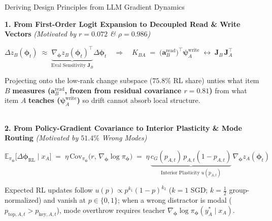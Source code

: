 \documentclass[aspectratio=169, 10pt]{beamer}
\begin{document}
\begin{frame}{Deriving Design Principles from LLM Gradient Dynamics}
  \footnotesize
  \vspace{-1.5mm}

  \noindent\textbf{\color{NavyHeader}1. From First-Order Logit Expansion to Decoupled Read \& Write Vectors} \hfill {\scriptsize\color{MutedGray}\emph{(Motivated by $r=0.072$ \& $\rho=0.986$)}}\\[0.6mm]
  {\centering $\displaystyle \Delta z_B(\boldsymbol{\phi}_t) \;\approx\; \underbrace{\nabla_{\boldsymbol{\phi}} z_B(\boldsymbol{\phi}_t)^\top}_{\text{Eval Sensitivity }\boldsymbol{J}_B}\Delta\boldsymbol{\phi}_t \quad\Longrightarrow\quad K_{BA} \;=\; \bigl(\boldsymbol{a}_B^{\mathrm{read}}\bigr)^\top \boldsymbol{\psi}_A^{\mathrm{write}} \;\longleftrightarrow\; \boldsymbol{J}_B\,\boldsymbol{J}_A^\top$\par}\vspace{0.5mm}
  Projecting onto the low-rank change subspace ($\mathbf{75.8\%}$ RL share) unties what item $B$ \textbf{measures ($\boldsymbol{a}_B^{\mathrm{read}}$, frozen from residual covariance $r=0.81$)} from what item $A$ \textbf{teaches ($\boldsymbol{\psi}_A^{\mathrm{write}}$)} so drift cannot absorb local structure.\par

  \vspace{1.2mm}
  \noindent{\color{BorderGray}\rule{\linewidth}{0.4pt}}\\[0.9mm]
  \textbf{\color{NavyHeader}2. From Policy-Gradient Covariance to Interior Plasticity \& Mode Routing} \hfill {\scriptsize\color{MutedGray}\emph{(Motivated by $51.4\%$ Wrong Modes)}}\\[0.6mm]
  {\centering $\displaystyle \mathbb{E}_{\pi_{\boldsymbol{\phi}}}\bigl[\Delta\boldsymbol{\phi}_{\mathrm{RL}} \mid x_A\bigr] \;=\; \eta\,\mathrm{Cov}_{\pi_{\boldsymbol{\phi}}}\bigl(r,\,\nabla_{\boldsymbol{\phi}}\log\pi_{\boldsymbol{\phi}}\bigr) \;=\; \eta\,\underbrace{c_G(p_{A,t})\,p_{A,t}(1-p_{A,t})}_{\text{Interior Plasticity }u(p_{A,t})}\,\nabla_{\boldsymbol{\phi}} z_A(\boldsymbol{\phi}_t)$\par}\vspace{0.5mm}
  Expected RL updates follow $u(p) \propto p^{k_1}(1-p)^{k_2}$ ($k=1$ SGD; $k=\tfrac{1}{2}$ group-normalized) and vanish at $p \in \{0,1\}$; when a wrong distractor is modal ($p_{\mathrm{top},A,t} > p_{\mathrm{key},A,t}$), mode overthrow requires teacher $\nabla_{\boldsymbol{\phi}}\log\pi_{\boldsymbol{\phi}}(y_A^*\mid x_A)$.\par


\end{frame}
\end{document}
